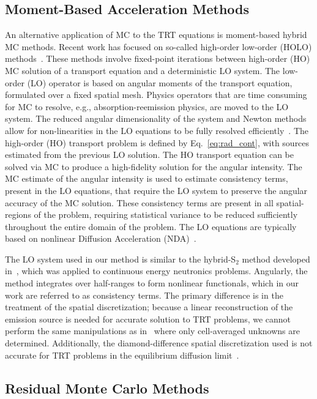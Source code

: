 \subsection{Moment-Based Acceleration Methods}

An alternative application of MC to the TRT equations is moment-based hybrid MC methods.
Recent work has focused on so-called high-order low-order (HOLO)
methods~\cite{willert,park,rmc,ans_2014,bolding_nse}. These methods involve fixed-point
iterations between high-order (HO) MC solution of a transport equation and a deterministic LO
system.  The low-order (LO)
operator is based on angular moments of the transport equation, formulated over a fixed
spatial mesh.  Physics operators that are time consuming for MC
to resolve, e.g., absorption-reemission physics, are moved to the LO
system.  The reduced angular dimensionality of the system and Newton methods allow for non-linearities in the LO equations to be fully
resolved efficiently~\cite{willert,park}.  The high-order (HO) transport problem is defined by 
Eq.~\eqref{eq:rad_cont}, with sources estimated from the previous LO solution.  
The HO transport equation can be  solved via MC to produce a high-fidelity solution for
the angular intensity.  The MC estimate of the angular intensity is used to estimate
consistency terms,
present in the LO equations, that require the LO system to preserve the angular accuracy of the
MC solution.   
These consistency terms are present in all spatial-regions of the problem, requiring
statistical variance to be reduced sufficiently throughout the entire domain of the
problem.   The LO equations are typically based on nonlinear Diffusion Acceleration
(NDA)~\cite{willert,park}. 

The LO system used in our method is similar to the hybrid-S$_2$
method developed in~\cite{wolters}, which was applied to continuous energy neutronics
problems.  Angularly, the method integrates over half-ranges to form nonlinear
functionals, which in our work are referred to as consistency terms.  The primary difference is in the treatment of the spatial discretization;
because a linear reconstruction of the emission source is needed for accurate solution to TRT
problems, we cannot perform the same manipulations as in~\cite{wolters} where only
cell-averaged unknowns are determined.  Additionally, the diamond-difference spatial
discretization used is not accurate for TRT problems in the equilibrium diffusion
limit~\cite{larsen_edl}.


\subsection{Residual Monte Carlo Methods}

